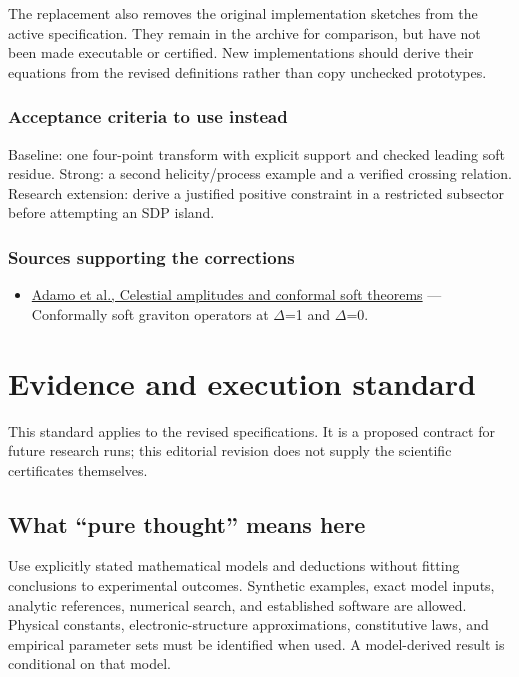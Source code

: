 \documentclass[
  11pt,
]{article}
\providecommand{\tightlist}{%
  \setlength{\itemsep}{0pt}\setlength{\parskip}{0pt}}
\begin{document}
The replacement also removes the original implementation sketches from
the active specification. They remain in the archive for comparison, but
have not been made executable or certified. New implementations should
derive their equations from the revised definitions rather than copy
unchecked prototypes.

\subsubsection{Acceptance criteria to use instead}

Baseline: one four-point transform with explicit support and checked
leading soft residue. Strong: a second helicity/process example and a
verified crossing relation. Research extension: derive a justified
positive constraint in a restricted subsector before attempting an SDP
island.

\subsubsection{Sources supporting the corrections}

\begin{itemize}
\tightlist
\item
  \href{https://www.pure.ed.ac.uk/ws/files/121747399/Adamo_2019_Class._Quantum_Grav._36_205018_1_.pdf}{Adamo
  et al., Celestial amplitudes and conformal soft theorems} ---
  Conformally soft graviton operators at \ensuremath{\Delta}=1 and
  \ensuremath{\Delta}=0.
\end{itemize}

\section{Evidence and execution standard}

This standard applies to the revised specifications. It is a proposed
contract for future research runs; this editorial revision does not
supply the scientific certificates themselves.

\subsection{What ``pure thought'' means here}

Use explicitly stated mathematical models and deductions without fitting
conclusions to experimental outcomes. Synthetic examples, exact model
inputs, analytic references, numerical search, and established software
are allowed. Physical constants, electronic-structure approximations,
constitutive laws, and empirical parameter sets must be identified when
used. A model-derived result is conditional on that model.
\end{document}
